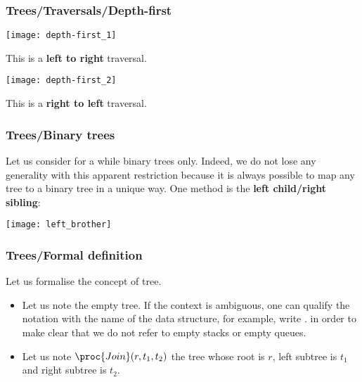 %
\begin{frame}
\frametitle{Trees/Traversals/Depth-first}

\begin{multicols}{2}
\texttt{[image: depth-first\_1]}

This is a \textbf{left to right} traversal.

\vfill\columnbreak

\texttt{[image: depth-first\_2]}

This is a \textbf{right to left} traversal.

\end{multicols}

\end{frame}

%
\begin{frame}
\frametitle{Trees/Binary trees}

Let us consider for a while binary trees only. Indeed, we do not lose
any generality with this apparent restriction because it is always
possible to map any tree to a binary tree in a unique way. One method
is the \textbf{left child/right sibling}:
\begin{center}
\texttt{[image: left\_brother]}
\end{center}

\end{frame}

%
\begin{frame}
\frametitle{Trees/Formal definition}

Let us formalise the concept of tree.
\begin{itemize}

  \item Let us note  the empty tree. If the context is
    ambiguous, one can qualify the notation with the name of the data
    structure, for example, write . in order to
    make clear that we do not refer to empty stacks or empty queues.

  \item Let us note \(\proc{Join} (r, t_1, t_2)\) the tree whose
    root is \(r\), left subtree is \(t_1\) and right subtree is
    \(t_2\).
 
\end{itemize}

\end{frame}

